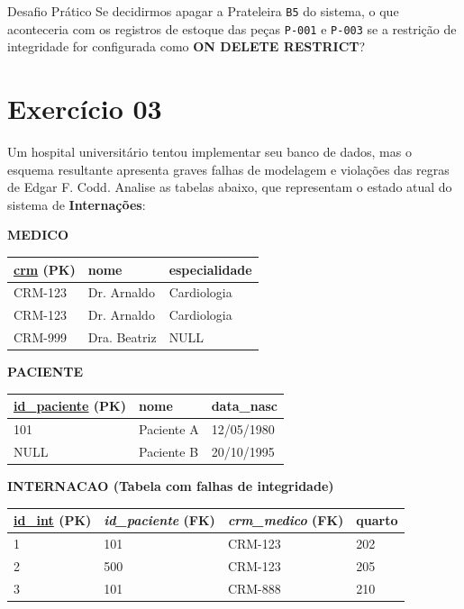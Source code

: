 \documentclass[12pt]{article}
\begin{document}
\begin{block}{Desafio Prático}
Se decidirmos apagar a Prateleira \texttt{B5} do sistema, o que aconteceria com os registros de estoque das peças \texttt{P-001} e \texttt{P-003} se a restrição de integridade for configurada como \textbf{ON DELETE RESTRICT}?
\end{block} 

\section*{Exercício 03}

Um hospital universitário tentou implementar seu banco de dados, mas o esquema resultante apresenta graves falhas de modelagem e violações das regras de Edgar F. Codd. Analise as tabelas abaixo, que representam o estado atual do sistema de \textbf{Internações}:

\begin{table}[H]
    \centering
    \small
    
    \textbf{MEDICO}\\
    \begin{tabular}{|l|l|l|}
    \hline
    \rowcolor{tableheader} \underline{crm} (PK) & nome & especialidade \\ \hline
    CRM-123 & Dr. Arnaldo & Cardiologia \\ \hline
    CRM-123 & Dr. Arnaldo & Cardiologia \\ \hline
    CRM-999 & Dra. Beatriz & NULL \\ \hline
    \end{tabular}

    \vspace{0.4cm}

    \textbf{PACIENTE}\\
    \begin{tabular}{|l|l|l|}
    \hline
    \rowcolor{tableheader} \underline{id\_paciente} (PK) & nome & data\_nasc \\ \hline
    101 & Paciente A & 12/05/1980 \\ \hline
    NULL & Paciente B & 20/10/1995 \\ \hline
    \end{tabular}

    \vspace{0.4cm}

    \textbf{INTERNACAO (Tabela com falhas de integridade)}\\
    \begin{tabular}{|l|l|l|l|}
    \hline
    \rowcolor{tableheader} \underline{id\_int} (PK) & \textit{id\_paciente} (FK) & \textit{crm\_medico} (FK) & quarto \\ \hline
    1 & 101 & CRM-123 & 202 \\ \hline
    2 & 500 & CRM-123 & 205 \\ \hline
    3 & 101 & CRM-888 & 210 \\ \hline
    \end{tabular}
\end{table}
\end{document}
